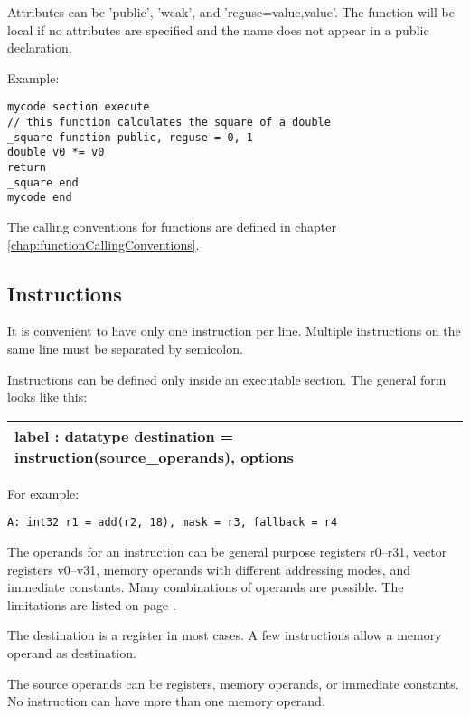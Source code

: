 \documentclass[forwardcom.tex]{subfiles}
\begin{document}
Attributes can be 'public', 'weak', and 'reguse=value,value'. 
The function will be local if no attributes are specified and 
the name does not appear in a public declaration.
\vv

Example:
\vspace{1mm}

\begin{lstlisting}[frame=single]
mycode section execute
// this function calculates the square of a double
_square function public, reguse = 0, 1
double v0 *= v0
return
_square end
mycode end
\end{lstlisting}
\vv

The calling conventions for functions are defined in chapter \ref{chap:functionCallingConventions}.
\vv


\subsection{Instructions} \label{assemblyInstructions}
It is convenient to have only one instruction per line. Multiple instructions on the same line must be separated by semicolon.
\vv

Instructions can be defined only inside an executable section. The general form looks like this:

\begin{tabular}{|p{130mm}|}
\hline
\hspace{4mm} label : datatype destination = instruction(source\_operands), options \\
\hline
\end{tabular}
\vspace{4mm}

For example:
\begin{lstlisting}[frame=single]
A: int32 r1 = add(r2, 18), mask = r3, fallback = r4
\end{lstlisting}
\vv

The operands for an instruction can be general purpose registers r0--r31, vector registers v0--v31, memory operands with different addressing modes, and immediate constants. Many combinations of operands are possible. The limitations are listed on page \pageref{formatLimitations}.
\vv

The destination is a register in most cases. A few instructions allow a memory operand as destination.
\vv

The source operands can be registers, memory operands, or immediate constants. 
No instruction can have more than one memory operand.
\vv
\end{document}
